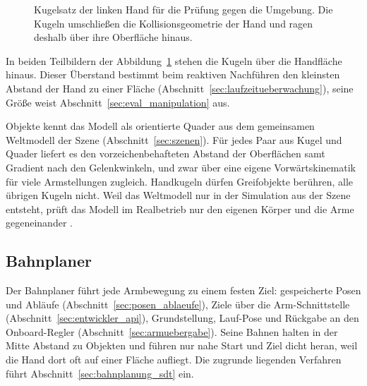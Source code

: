 \begin{figure}[htbp]
  \centering
  
  \caption[Kugelmodell der Hand]{Kugelsatz der linken Hand für die Prüfung gegen die Umgebung. Die Kugeln umschließen die Kollisionsgeometrie der Hand und ragen deshalb über ihre Oberfläche hinaus.}
  \label{fig:kugelmodell}
\end{figure}

In beiden Teilbildern der Abbildung~\ref{fig:kugelmodell} stehen die Kugeln über die Handfläche hinaus.
Dieser Überstand bestimmt beim reaktiven Nachführen den kleinsten Abstand der Hand zu einer Fläche (Abschnitt~\ref{sec:laufzeitueberwachung}), seine Größe weist Abschnitt~\ref{sec:eval_manipulation} aus.

Objekte kennt das Modell als orientierte Quader aus dem gemeinsamen Weltmodell der Szene (Abschnitt~\ref{sec:szenen}).
Für jedes Paar aus Kugel und Quader liefert es den vorzeichenbehafteten Abstand der Oberflächen samt Gradient nach den Gelenkwinkeln, und zwar über eine eigene Vorwärtskinematik für viele Armstellungen zugleich.
Handkugeln dürfen Greifobjekte berühren, alle übrigen Kugeln nicht.
Weil das Weltmodell nur in der Simulation aus der Szene entsteht, prüft das Modell im Realbetrieb nur den eigenen Körper und die Arme gegeneinander .

\subsection{Bahnplaner}
\label{sec:bahnplaner}

Der Bahnplaner führt jede Armbewegung zu einem festen Ziel: gespeicherte Posen und Abläufe (Abschnitt~\ref{sec:posen_ablaeufe}), Ziele über die Arm-Schnittstelle (Abschnitt~\ref{sec:entwickler_api}), Grundstellung, Lauf-Pose und Rückgabe an den Onboard-Regler (Abschnitt~\ref{sec:armuebergabe}).
Seine Bahnen halten in der Mitte Abstand zu Objekten und führen nur nahe Start und Ziel dicht heran, weil die Hand dort oft auf einer Fläche aufliegt.
Die zugrunde liegenden Verfahren führt Abschnitt~\ref{sec:bahnplanung_sdt} ein.

